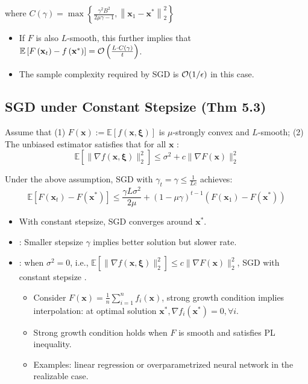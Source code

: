 where $C(\gamma)=\max \left\{\frac{\gamma^{2} B^{2}}{2 \mu \gamma-1},\left\|\mathbf{x}_{1}-\mathbf{x}^{*}\right\|_{2}^{2}\right\}$

\begin{itemize}[leftmargin=*]
    \item If $F$ is also $L$-smooth, this further implies that $\mathbb{E}\left[F\left(\mathbf{x}_{t}\right)-f\left(\mathbf{x}^{*}\right)\right]=\operatorname{\mathcal{O}}\left(\frac{L \cdot C(\gamma)}{t}\right)$.
    \item The sample complexity required by SGD is $\operatorname{\mathcal{O}}(1 / \epsilon)$ in this case.
\end{itemize}





\subsection*{SGD under Constant Stepsize (Thm 5.3)}
Assume that (1) $F(\mathbf{x}):=\mathbb{E}[f(\mathbf{x}, \boldsymbol{\xi})]$ is $\mu$-strongly convex and $L$-smooth; (2) The unbiased estimator satisfies that for all $\mathbf{x}$ :
$$
\mathbb{E}\left[\|\nabla f(\mathbf{x}, \boldsymbol{\xi})\|_{2}^{2}\right] \leq \sigma^{2}+c\|\nabla F(\mathbf{x})\|_{2}^{2}
$$

Under the above assumption, SGD with $\gamma_{t}=\gamma \leq \frac{1}{L c}$ achieves:
$$
\mathbb{E}\left[F\left(\mathbf{x}_{t}\right)-F\left(\mathbf{x}^{*}\right)\right] \leq \frac{\gamma L \sigma^{2}}{2 \mu}+(1-\mu \gamma)^{t-1}\left(F\left(\mathbf{x}_{1}\right)-F\left(\mathbf{x}^{*}\right)\right)
$$
\begin{itemize}[leftmargin=*]
    \item With constant stepsize, SGD converges  around $\mathbf{x}^{*}$.
    \item {}: Smaller stepsize $\gamma$ implies better solution but slower rate.

    \item {}: when $\sigma^{2}=0$, i.e., $\mathbb{E}\left[\|\nabla f(\mathbf{x}, \boldsymbol{\xi})\|_{2}^{2}\right] \leq c\|\nabla F(\mathbf{x})\|_{2}^{2}$, SGD with constant stepsize .
    \begin{itemize}[leftmargin=*]
        \item Consider $F(\mathbf{x})=\frac{1}{n} \sum_{i=1}^{n} f_{i}(\mathbf{x})$, strong growth condition implies interpolation: at optimal solution $\mathbf{x}^{*}, \nabla f_{i}\left(\mathbf{x}^{*}\right)=0, \forall i$.
        \item Strong growth condition holds when $F$ is smooth and satisfies PL inequality.
        \item Examples: linear regression or overparametrized neural network in the realizable case.
    \end{itemize}
\end{itemize}







